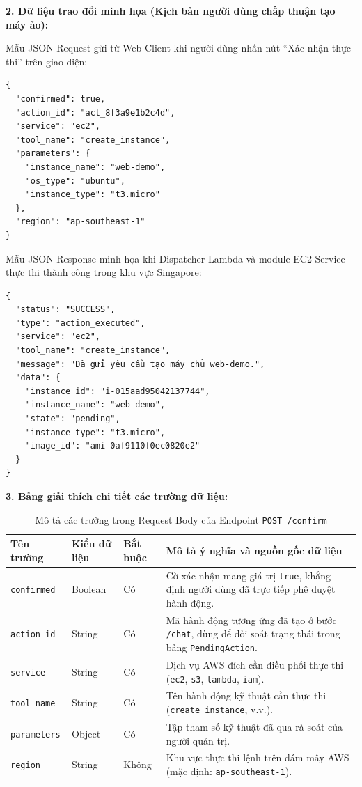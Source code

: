 \documentclass[a4paper,12pt]{article}
\begin{document}
\textbf{2. Dữ liệu trao đổi minh họa (Kịch bản người dùng chấp thuận tạo máy ảo):}

Mẫu JSON Request gửi từ Web Client khi người dùng nhấn nút ``Xác nhận thực thi'' trên giao diện:

\begin{verbatim}
{
  "confirmed": true,
  "action_id": "act_8f3a9e1b2c4d",
  "service": "ec2",
  "tool_name": "create_instance",
  "parameters": {
    "instance_name": "web-demo",
    "os_type": "ubuntu",
    "instance_type": "t3.micro"
  },
  "region": "ap-southeast-1"
}
\end{verbatim}

Mẫu JSON Response minh họa khi Dispatcher Lambda và module EC2 Service thực thi thành công trong khu vực Singapore:

\begin{verbatim}
{
  "status": "SUCCESS",
  "type": "action_executed",
  "service": "ec2",
  "tool_name": "create_instance",
  "message": "Đã gửi yêu cầu tạo máy chủ web-demo.",
  "data": {
    "instance_id": "i-015aad95042137744",
    "instance_name": "web-demo",
    "state": "pending",
    "instance_type": "t3.micro",
    "image_id": "ami-0af9110f0ec0820e2"
  }
}
\end{verbatim}

\textbf{3. Bảng giải thích chi tiết các trường dữ liệu:}

\begin{table}[H]
\centering
\caption{Mô tả các trường trong Request Body của Endpoint \texttt{POST /confirm}}
\label{tab:confirm_request}
\begingroup
\renewcommand{\arraystretch}{1.12}
\fontsize{10}{13}\selectfont
\begin{tabularx}{\linewidth}{@{}>{\raggedright\arraybackslash}p{2.5cm}>{\raggedright\arraybackslash}p{2.3cm}>{\centering\arraybackslash}p{1.8cm}Y@{}}
\toprule
\textbf{Tên trường} & \textbf{Kiểu dữ liệu} & \textbf{Bắt buộc} & \textbf{Mô tả ý nghĩa và nguồn gốc dữ liệu} \\
\midrule
\texttt{confirmed} & Boolean & Có & Cờ xác nhận mang giá trị \texttt{true}, khẳng định người dùng đã trực tiếp phê duyệt hành động. \\
\texttt{action\_id} & String & Có & Mã hành động tương ứng đã tạo ở bước \texttt{/chat}, dùng để đối soát trạng thái trong bảng \texttt{PendingAction}. \\
\texttt{service} & String & Có & Dịch vụ AWS đích cần điều phối thực thi (\texttt{ec2}, \texttt{s3}, \texttt{lambda}, \texttt{iam}). \\
\texttt{tool\_name} & String & Có & Tên hành động kỹ thuật cần thực thi (\texttt{create\_instance}, v.v.). \\
\texttt{parameters} & Object & Có & Tập tham số kỹ thuật đã qua rà soát của người quản trị. \\
\texttt{region} & String & Không & Khu vực thực thi lệnh trên đám mây AWS (mặc định: \texttt{ap-southeast-1}). \\
\bottomrule
\end{tabularx}
\endgroup
\end{table}
\end{document}
